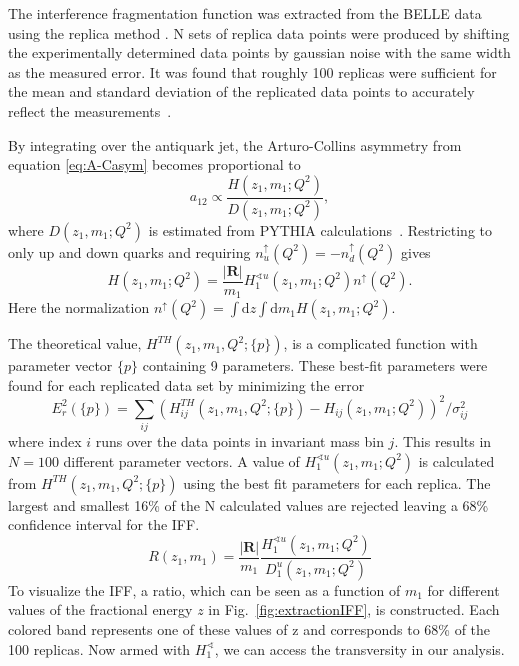 \documentclass[letterpaper, abstract = on,listof=totoc, bibliography=totoc]{scrreprt}
\begin{document}
The interference fragmentation function was extracted from the BELLE data using the replica method \cite{extractIFF}. N sets of replica data points were produced by shifting the experimentally determined data points by gaussian noise with the same width as the measured error. It was found that roughly 100 replicas were sufficient for the mean and standard deviation of the replicated data points to accurately reflect the measurements~\cite{extractIFF2}. 

By integrating over the antiquark jet, the Arturo-Collins asymmetry from equation \ref{eq:A-Casym} becomes proportional to
\begin{equation}
a_{12} \propto \frac{H(z_1,m_1;Q^2)}{D(z_1,m_1;Q^2)},
\end{equation}
where $D(z_1,m_1;Q^2)$ 
is estimated from PYTHIA calculations~\cite{Courtoy:2012ry}.
Restricting to only up and down quarks and requiring $n_u^\uparrow(Q^2) = -n_d^\uparrow(Q^2)$ gives
\begin{equation}
H(z_1,m_1;Q^2) = \frac{|\bm{R}|}{m_1}H_1^{\sphericalangle u}(z_1,m_1;Q^2)n^\uparrow(Q^2).
\end{equation}
Here the normalization $n^\uparrow(Q^2) = \int\text{d}z\int\text{d}m_1 H(z_1,m_1;Q^2)$. 

The theoretical value, $H^{TH}(z_1,m_1,Q^2;\{p\})$, is a complicated function\cite{RealEstValTrans} with parameter vector $\{p\}$ containing 9 parameters. These best-fit parameters were found for each replicated data set by minimizing the error
\begin{equation}
E_r^2(\{p\}) = \sum\limits_{ij} \left(H_{ij}^{TH}(z_1,m_1,Q^2;\{p\}) - H_{ij}(z_1,m_1;Q^2)\right)^2/\sigma_{ij}^2
\end{equation}
where index $i$ runs over the data points in invariant mass bin $j$. This results in $N=100$ different parameter vectors. A value of $H_1^{\sphericalangle u}(z_1,m_1;Q^2)$ is calculated from $H^{TH}(z_1,m_1,Q^2;\{p\})$ using the best fit parameters for each replica. The largest and smallest 16\% of the N calculated values are rejected leaving a 68\% confidence interval for the IFF.
\begin{equation}
R(z_1,m_1) = \frac{|\bm{R}|}{m_1} \frac{H_1^{\sphericalangle u}(z_1,m_1;Q^2)}{D_1^u(z_1,m_1;Q^2)}
\end{equation}
To visualize the IFF, a ratio, which can be seen as a function of $m_1$ for different values of the fractional energy $z$ in Fig.~\ref{fig:extractionIFF}, is constructed. Each colored band represents one of these values of z and corresponds to 68\% of the 100 replicas. Now armed with $H_1^\sphericalangle$, we can access the transversity in our analysis.  
\end{document}
